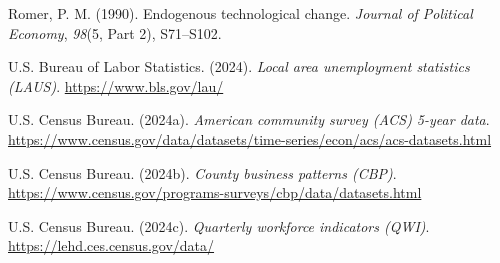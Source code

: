 \documentclass[
]{article}
\newlength{\cslhangindent}
\newenvironment{CSLReferences}[2] %
 {\begin{list}{}{%
  \setlength{\itemindent}{0pt}
  \setlength{\leftmargin}{0pt}
  \setlength{\parsep}{0pt}
  \ifodd #1
   \setlength{\leftmargin}{\cslhangindent}
   \setlength{\itemindent}{-1\cslhangindent}
  \fi
  \setlength{\itemsep}{#2\baselineskip}}}
 {\end{list}}
\begin{document}
\begin{CSLReferences}{1}{0}
Romer, P. M. (1990). Endogenous technological change. \emph{Journal of
Political Economy}, \emph{98}(5, Part 2), S71--S102.

U.S. Bureau of Labor Statistics. (2024). \emph{Local area unemployment
statistics (LAUS)}. \url{https://www.bls.gov/lau/}

U.S. Census Bureau. (2024a). \emph{American community survey (ACS)
5-year data}.
\url{https://www.census.gov/data/datasets/time-series/econ/acs/acs-datasets.html}

U.S. Census Bureau. (2024b). \emph{County business patterns (CBP)}.
\url{https://www.census.gov/programs-surveys/cbp/data/datasets.html}

U.S. Census Bureau. (2024c). \emph{Quarterly workforce indicators
(QWI)}. \url{https://lehd.ces.census.gov/data/}

\end{CSLReferences}
\end{document}
